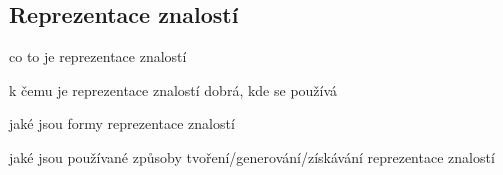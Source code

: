 \subsection{Reprezentace znalostí}
{\color{blue}co to je reprezentace znalostí}

{\color{blue}k čemu je reprezentace znalostí dobrá, kde se používá}

{\color{blue}jaké jsou formy reprezentace znalostí}

{\color{blue}jaké jsou používané způsoby tvoření/generování/získávání reprezentace znalostí}
